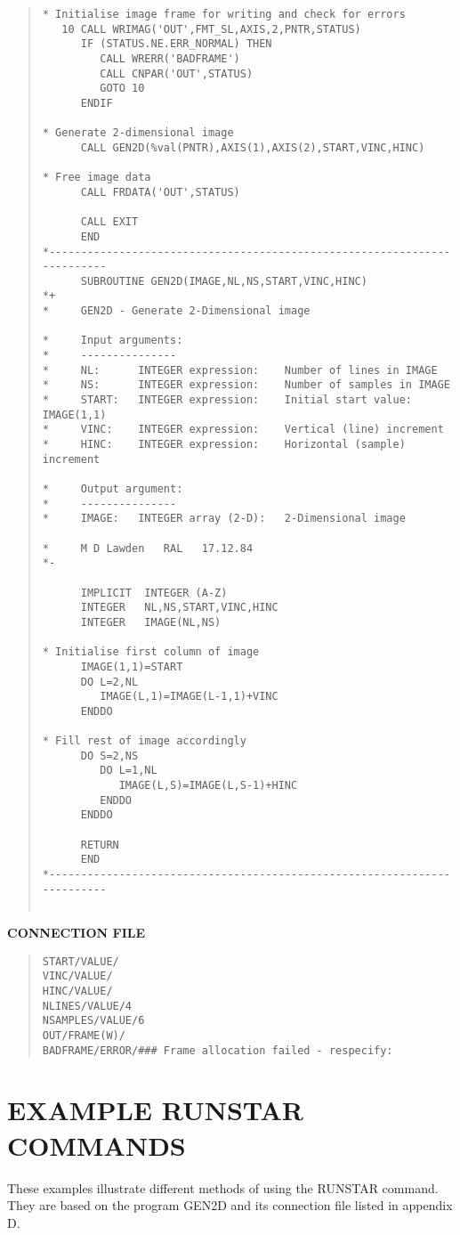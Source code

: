 \documentclass{article}
\begin{document}
\begin{quote}
\begin{verbatim}
* Initialise image frame for writing and check for errors
   10 CALL WRIMAG('OUT',FMT_SL,AXIS,2,PNTR,STATUS)
      IF (STATUS.NE.ERR_NORMAL) THEN
         CALL WRERR('BADFRAME')
         CALL CNPAR('OUT',STATUS)
         GOTO 10
      ENDIF

* Generate 2-dimensional image
      CALL GEN2D(%val(PNTR),AXIS(1),AXIS(2),START,VINC,HINC)

* Free image data
      CALL FRDATA('OUT',STATUS)

      CALL EXIT
      END
*-------------------------------------------------------------------------
      SUBROUTINE GEN2D(IMAGE,NL,NS,START,VINC,HINC)
*+
*     GEN2D - Generate 2-Dimensional image

*     Input arguments:
*     ---------------
*     NL:      INTEGER expression:    Number of lines in IMAGE
*     NS:      INTEGER expression:    Number of samples in IMAGE
*     START:   INTEGER expression:    Initial start value: IMAGE(1,1)
*     VINC:    INTEGER expression:    Vertical (line) increment
*     HINC:    INTEGER expression:    Horizontal (sample) increment

*     Output argument:
*     ---------------
*     IMAGE:   INTEGER array (2-D):   2-Dimensional image

*     M D Lawden   RAL   17.12.84
*-

      IMPLICIT  INTEGER (A-Z)
      INTEGER   NL,NS,START,VINC,HINC
      INTEGER   IMAGE(NL,NS)

* Initialise first column of image
      IMAGE(1,1)=START
      DO L=2,NL
         IMAGE(L,1)=IMAGE(L-1,1)+VINC
      ENDDO

* Fill rest of image accordingly
      DO S=2,NS
         DO L=1,NL
            IMAGE(L,S)=IMAGE(L,S-1)+HINC
         ENDDO
      ENDDO

      RETURN
      END
*-------------------------------------------------------------------------


\end{verbatim}
\end{quote}
\begin{center}
{\bf CONNECTION FILE}
\end{center}
\begin{quote}
\begin{verbatim}
START/VALUE/
VINC/VALUE/
HINC/VALUE/
NLINES/VALUE/4
NSAMPLES/VALUE/6
OUT/FRAME(W)/
BADFRAME/ERROR/### Frame allocation failed - respecify:
\end{verbatim}
\end{quote}
\section {EXAMPLE RUNSTAR COMMANDS}
These examples illustrate different methods of using the RUNSTAR command.
They are based on the program GEN2D and its connection file listed in appendix
D.
\end{document}
